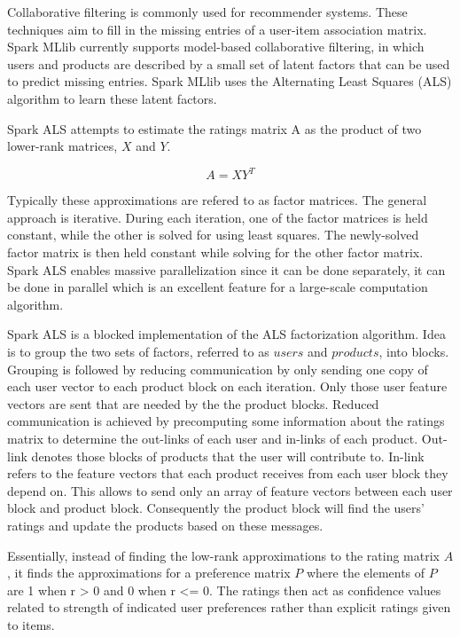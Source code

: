\documentclass[12pt,a4paper,english
]{tutthesis}
\begin{document}
Collaborative filtering is commonly used for recommender systems. These techniques aim to fill in the missing entries of a user-item association matrix. Spark MLlib currently supports model-based collaborative filtering, in which users and products are described by a small set of latent factors that can be used to predict missing entries. Spark MLlib uses the Alternating Least Squares (ALS) algorithm to learn these latent factors. \cite{spark14}

Spark ALS attempts to estimate the ratings matrix A as the product of two lower-rank matrices, $X$ and $Y$. \cite{als14}

\begin{equation}
A = XY^T
\end{equation}

Typically these approximations are refered to as factor matrices. The general approach is iterative. During each iteration, one of the factor matrices is held constant, while the other is solved for using least squares. The newly-solved factor matrix is then held constant while solving for the other factor matrix. \cite{als14} Spark ALS enables massive parallelization since it can be done separately, it can be done in parallel which is an excellent feature for a large-scale computation algorithm. \cite{ryza15}

Spark ALS is a blocked implementation of the ALS factorization algorithm. Idea is to group the two sets of factors, referred to as $users$ and $products$, into blocks. Grouping is followed by reducing communication by only sending one copy of each user vector to each product block on each iteration. Only those user feature vectors are sent that are needed by the the product blocks. Reduced communication is achieved by precomputing some information about the ratings matrix to determine the out-links of each user and in-links of each product. Out-link denotes those blocks of products that the user will contribute to. In-link refers to the feature vectors that each product receives from each user block they depend on. This allows to send only an array of feature vectors between each user block and product block. Consequently the product block will find the users' ratings and update the products based on these messages. \cite{als14}

Essentially, instead of finding the low-rank approximations to the rating matrix $A$, it finds the approximations for a preference matrix $P$ where the elements of $P$ are 1 when r > 0 and 0 when r <= 0. The ratings then act as confidence values related to strength of indicated user preferences rather than explicit ratings given to items. \cite{als14}
\end{document}
